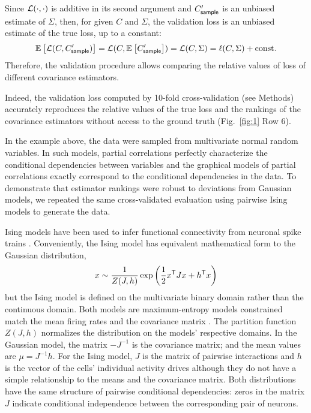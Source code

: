 Since $\mathcal L(\cdot,\cdot)$ is additive in its second argument and $C^\prime_{\sf sample}$ is an unbiased estimate of $\Sigma$, then, for given $C$ and $\Sigma$, the validation loss is an unbiased estimate of the true loss, up to a constant:
\begin{equation}
    \mathbb E_{}\left[ \mathcal L(C,C_{\sf sample}^\prime)\right]=\mathcal L(C,\mathbb E_{}\left[ C_{\sf sample}^\prime\right])=\mathcal L(C,\Sigma) = \ell(C,\Sigma) + \mbox{const}.
\end{equation}
Therefore, the validation procedure allows comparing the relative values of loss of different covariance estimators.

Indeed, the validation loss computed by 10-fold cross-validation (see Methods) accurately reproduces the relative values of the true loss and the rankings of the covariance estimators without access to the ground truth (Fig.~\ref{fig:1} Row 6). 

In the example above, the data were sampled from  multivariate normal random variables. In such models, partial correlations perfectly characterize the conditional dependencies between variables and the graphical models of partial correlations exactly correspond to the conditional dependencies in the data. 
To demonstrate that estimator rankings were robust to deviations from Gaussian models, we repeated the same cross-validated evaluation using pairwise Ising models to generate the data.

Ising models have been used to infer functional connectivity from neuronal spike trains \cite{Hertz:2011}. 
Conveniently, the Ising model has equivalent mathematical form to the Gaussian distribution,
\begin{equation}\label{eq:ising}
    x\sim \frac 1 {Z(J,h)} \exp\left(\frac 1 2 x^{\sf T} J x + h^{\sf T} x \right)
\end{equation}
but the Ising model is defined on the multivariate binary domain rather than the continuous domain. 
Both models are maximum-entropy models constrained match the mean firing rates and the covariance matrix \cite{Jaynes:1957}.
The partition function $Z(J,h)$ normalizes the distribution on the models' respective domains. 
In the Gaussian model, the matrix $-J^{-1}$ is the covariance matrix; and the mean values are $\mu=J^{-1}h$.  
For the Ising model, $J$ is the matrix of pairwise interactions and $h$ is the vector of the cells' individual activity drives although they do not have a simple relationship to the means and the covariance matrix. 
Both distributions have the same structure of pairwise conditional dependencies: zeros in the matrix $J$ indicate conditional independence between the corresponding pair of neurons. 

